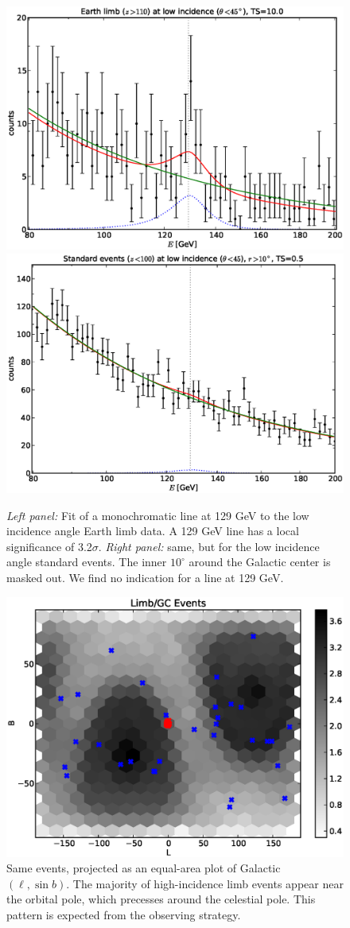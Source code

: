 \documentclass[aps,twocolumn,prd,superscriptaddress,showpacs,nofootinbib,fixfloat]{revtex4}
\begin{document}
\begin{figure}[p]
  \centering
  \includegraphics[width=0.48\linewidth]{plots/albedo_line_thetaCut.eps}
  \includegraphics[width=0.48\linewidth]{plots/noalbedo_line_thetaCut.eps}
  \caption{\emph{Left panel:} Fit of a monochromatic line at 129 GeV to the
  low incidence angle Earth limb data. A 129 GeV line has a local significance of
  3.2$\sigma$.  \emph{Right panel:} same, but for the low incidence angle
  standard events. The inner $10^\circ$ around the Galactic center is masked
  out. We find no indication for a line at 129 GeV.}
  \label{fig:albedoline}
\end{figure}

\begin{figure}[p]
  \centering
  \includegraphics[width=1.0\linewidth]{plots/limb_l_b.eps}
  \caption{Same events, projected as an equal-area plot of Galactic $(\ell,
  \sin b)$.  The majority of high-incidence limb events appear near the
  orbital pole, which precesses around the celestial pole.  This pattern is
  expected from the observing strategy.}
  \label{fig:l-b}
\end{figure}
\end{document}
